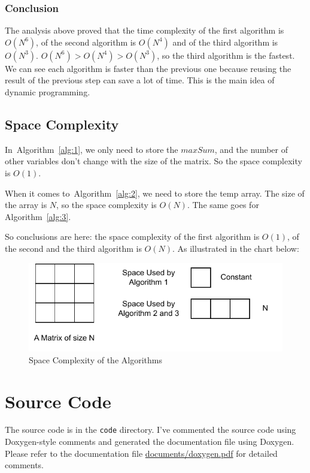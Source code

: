 \documentclass[a4paper,oneside]{book}
\begin{document}
\subsection{Conclusion}

The analysis above proved that the time complexity of the first algorithm is
$O(N^6)$, of the second algorithm is $O(N^4)$ and of the third algorithm is
$O(N^3)$. $O(N^6) > O(N^4) > O(N^3)$, so the third algorithm is the fastest. We
can see each algorithm is faster than the previous one because reusing the
result of the previous step can save a lot of time. This is the main idea of
dynamic programming.

\section{Space Complexity}

In~Algorithm~\ref{alg:1}, we only need to store the $maxSum$, and the number of
other variables don't change with the size of the matrix. So the space
complexity is $O(1)$.

When it comes to~Algorithm~\ref{alg:2}, we need to store the temp array. The
size of the array is $N$, so the space complexity is $O(N)$. The same goes for
Algorithm~\ref{alg:3}.

So conclusions are here: the space complexity of the first algorithm is $O(1)$,
of the second and the third algorithm is $O(N)$. As illustrated in the chart
below:

\begin{figure}[!ht]
    \caption{Space Complexity of the Algorithms}\label{fig:space}
    \centering
    \includegraphics{src/space}
\end{figure}


\appendix

\chapter{Source Code}

The source code is in the \verb|code| directory. I've commented the source code
using Doxygen-style comments and generated the documentation file using Doxygen.
Please refer to the documentation file \href{run:./doxygen.pdf}{documents/doxygen.pdf} for
detailed comments.
\end{document}
